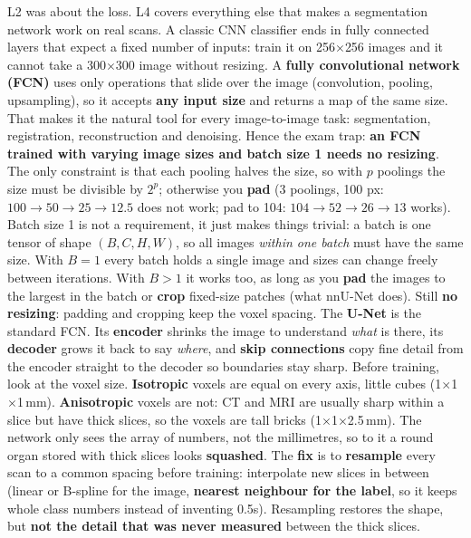 \documentclass[a4paper]{article}
\newcommand{\K}[1]{\textcolor{kg}{\textbf{#1}}}
\newcommand{\E}[1]{\textcolor{ep}{#1}}
\newcommand{\T}[1]{\textcolor{tr}{\textbf{#1}}}
\begin{document}
L2 was about the loss. L4 covers everything else that makes a segmentation network work on real scans. A classic CNN classifier ends in fully connected layers that expect a fixed number of inputs: train it on 256$\times$256 images and it cannot take a 300$\times$300 image without resizing. A \K{fully convolutional network (FCN)} uses only operations that slide over the image (convolution, pooling, upsampling), so it accepts \K{any input size} and returns a map of the same size. That makes it the natural tool for every image-to-image task: segmentation, registration, reconstruction and denoising. Hence the exam trap: \T{an FCN trained with varying image sizes and batch size 1 needs no resizing}. The only constraint is that each pooling halves the size, so with $p$ poolings the size must be divisible by $2^p$; otherwise you \K{pad} (\E{3 poolings, 100 px: $100\to50\to25\to12.5$ does not work; pad to 104: $104\to52\to26\to13$ works}). Batch size 1 is not a requirement, it just makes things trivial: a batch is one tensor of shape $(B,C,H,W)$, so all images \emph{within one batch} must have the same size. With $B{=}1$ every batch holds a single image and sizes can change freely between iterations. With $B{>}1$ it works too, as long as you \K{pad} the images to the largest in the batch or \K{crop} fixed-size patches (what nnU-Net does). Still \T{no resizing}: padding and cropping keep the voxel spacing. The \K{U-Net} is the standard FCN. Its \K{encoder} shrinks the image to understand \emph{what} is there, its \K{decoder} grows it back to say \emph{where}, and \K{skip connections} copy fine detail from the encoder straight to the decoder so boundaries stay sharp.
Before training, look at the voxel size. \K{Isotropic} voxels are equal on every axis, little cubes (\E{1$\times$1$\times$1\,mm}). \K{Anisotropic} voxels are not: CT and MRI are usually sharp within a slice but have thick slices, so the voxels are tall bricks (\E{1$\times$1$\times$2.5\,mm}). The network only sees the array of numbers, not the millimetres, so to it a round organ stored with thick slices looks \T{squashed}. The \K{fix} is to \K{resample} every scan to a common spacing before training: interpolate new slices in between (linear or B-spline for the image, \T{nearest neighbour for the label}, so it keeps whole class numbers instead of inventing 0.5s). Resampling restores the shape, but \T{not the detail that was never measured} between the thick slices.
\end{document}
